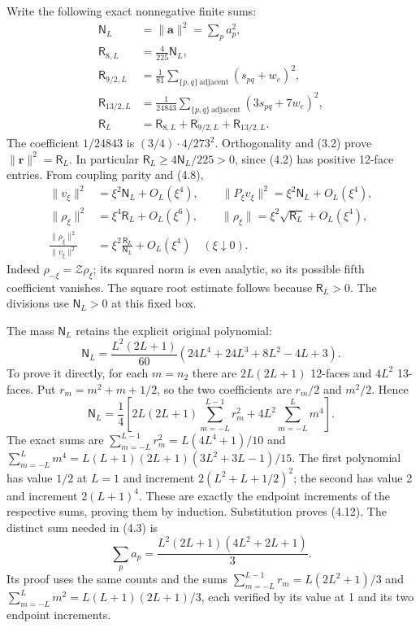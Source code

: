 \documentclass[
  11pt,
]{article}
\begin{document}
Write the following exact nonnegative finite sums: \[
\begin{split}
 \mathsf N_L&=\|\mathbf a\|^2=\sum_pa_p^2,\\
 \mathsf R_{8,L}&=\frac4{225}\mathsf N_L,\\
 \mathsf R_{9/2,L}&=\frac1{81}
      \sum_{\{p,q\}\,\text{adjacent}}(s_{pq}+w_e)^2,\\
 \mathsf R_{13/2,L}&=\frac1{24843}
      \sum_{\{p,q\}\,\text{adjacent}}(3s_{pq}+7w_e)^2,\\
 \mathsf R_L&=\mathsf R_{8,L}+\mathsf R_{9/2,L}+\mathsf R_{13/2,L}.
\end{split}
\tag{4.10}
\] The coefficient \(1/24843\) is \((3/4)\cdot4/273^2\). Orthogonality
and (3.2) prove \(\|\mathbf r\|^2=\mathsf R_L\). In particular
\(\mathsf R_L\ge4\mathsf N_L/225>0\), since (4.2) has positive 12-face
entries. From coupling parity and (4.8), \[
\begin{split}
 \|v_\xi\|^2&=\xi^2\mathsf N_L+O_L(\xi^4),\qquad
 \|P_\xi v_\xi\|^2=\xi^2\mathsf N_L+O_L(\xi^4),\\
 \|\rho_\xi\|^2&=\xi^4\mathsf R_L+O_L(\xi^6),
 \qquad \|\rho_\xi\|=\xi^2\sqrt{\mathsf R_L}+O_L(\xi^4),\\
 \frac{\|\rho_\xi\|^2}{\|v_\xi\|^2}
   &=\xi^2\frac{\mathsf R_L}{\mathsf N_L}+O_L(\xi^4)
       \quad (\xi\downarrow0).
\end{split}
\tag{4.11}
\] Indeed \(\rho_{-\xi}=\mathcal Z\rho_\xi\); its squared norm is even
analytic, so its possible fifth coefficient vanishes. The square root
estimate follows because \(\mathsf R_L>0\). The divisions use
\(\mathsf N_L>0\) at this fixed box.

The mass \(\mathsf N_L\) retains the explicit original polynomial: \[
\boxed{
 \mathsf N_L=\frac{L^2(2L+1)}{60}
       (24L^4+24L^3+8L^2-4L+3).}
\tag{4.12}
\] To prove it directly, for each \(m=n_2\) there are \(2L(2L+1)\)
12-faces and \(4L^2\) 13-faces. Put \(r_m=m^2+m+1/2\), so the two
coefficients are \(r_m/2\) and \(m^2/2\). Hence \[
 \mathsf N_L=\frac14\left[
 2L(2L+1)\sum_{m=-L}^{L-1}r_m^2
 +4L^2\sum_{m=-L}^Lm^4\right].
\tag{4.13}
\] The exact sums are \(\sum_{m=-L}^{L-1}r_m^2=L(4L^4+1)/10\) and
\(\sum_{m=-L}^Lm^4=L(L+1)(2L+1)(3L^2+3L-1)/15\). The first polynomial
has value \(1/2\) at \(L=1\) and increment \(2(L^2+L+1/2)^2\); the
second has value 2 and increment \(2(L+1)^4\). These are exactly the
endpoint increments of the respective sums, proving them by induction.
Substitution proves (4.12). The distinct sum needed in (4.3) is \[
 \sum_pa_p=\frac{L^2(2L+1)(4L^2+2L+1)}3.
\tag{4.14}
\] Its proof uses the same counts and the sums
\(\sum_{m=-L}^{L-1}r_m=L(2L^2+1)/3\) and
\(\sum_{m=-L}^Lm^2=L(L+1)(2L+1)/3\), each verified by its value at 1 and
its two endpoint increments.
\end{document}
